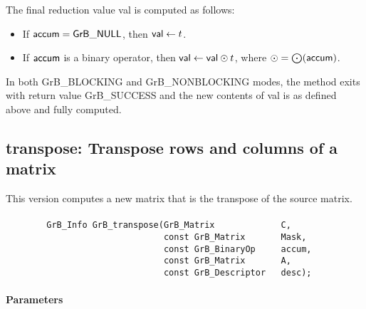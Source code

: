 The final reduction value {\sf val} is computed as follows:
\begin{itemize}
	\item If ${\sf accum} = {\sf GrB\_NULL}$, then ${\sf val} \leftarrow t$.

	\item If ${\sf accum}$ is a binary operator, then ${\sf val} \leftarrow {\sf val} \odot t$,
    where $\odot  = \bigodot({\sf accum})$. 
\end{itemize}

In both {\sf GrB\_BLOCKING} and {\sf GrB\_NONBLOCKING} modes, the method exits with return value 
{\sf GrB\_SUCCESS} and the new contents of {\sf val} is as defined above
and fully computed.



\subsection{{\sf transpose}: Transpose rows and columns of a matrix}

This version computes a new matrix that is the transpose of the source matrix.

\paragraph{\syntax}

\begin{verbatim}
        GrB_Info GrB_transpose(GrB_Matrix             C,
                               const GrB_Matrix       Mask,
                               const GrB_BinaryOp     accum,
                               const GrB_Matrix       A,
                               const GrB_Descriptor   desc);
\end{verbatim}

\paragraph{Parameters}

